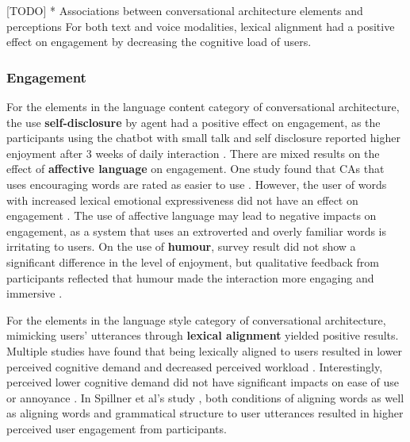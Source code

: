 \documentclass[sigconf,screen,review, anonymous]{acmart}
\newcommand{\cmt}[1]{}%
\begin{document}
[TODO] * Associations between conversational architecture elements and perceptions
For both text and voice modalities, lexical alignment had a positive effect on engagement by decreasing the cognitive load of users. 

\subsubsection{Engagement}
For the elements in the language content category of conversational architecture, the use \textbf{self-disclosure} by agent had a positive effect on engagement, as the participants using the chatbot with small talk and self disclosure reported higher enjoyment after 3 weeks of daily interaction \cite{lee2020hear}\cmt{[23]}. There are mixed results on the effect of \textbf{affective language} on engagement. One study found that CAs that uses encouraging words are rated as easier to use \cite{healey2013relating}\cmt{[39]}. However, the user of words with increased lexical emotional expressiveness did not have an effect on engagement \cite{zhu2022effects}\cmt{[26]}. The use of affective language may lead to negative impacts on engagement, as a system that uses an extroverted and overly familiar words is irritating to users. On the use of \textbf{humour}, survey result did not show a significant difference in the level of enjoyment, but qualitative feedback from participants reflected that humour made the interaction more engaging and immersive \cite{ceha2021can}\cmt{[57]}.

For the elements in the language style category of conversational architecture, mimicking users' utterances through \textbf{lexical alignment} yielded positive results. Multiple studies have found that being lexically aligned to users resulted in lower perceived cognitive demand and decreased perceived workload \cite{huiyang2022improving}\cmt{[17]}\cite{linnemann2018can}\cmt{[15]}\cite{spillner2021talk}\cmt{[18]}. Interestingly, perceived lower cognitive demand did not have significant impacts on ease of use \cite{linnemann2018can}\cmt{[15]} or annoyance \cite{huiyang2022improving}\cmt{[17]}. In Spillner et al's study \cite{spillner2021talk}\cmt{[18]}, both conditions of aligning words as well as aligning words and grammatical structure to user utterances resulted in higher perceived user engagement from participants. 
\end{document}
